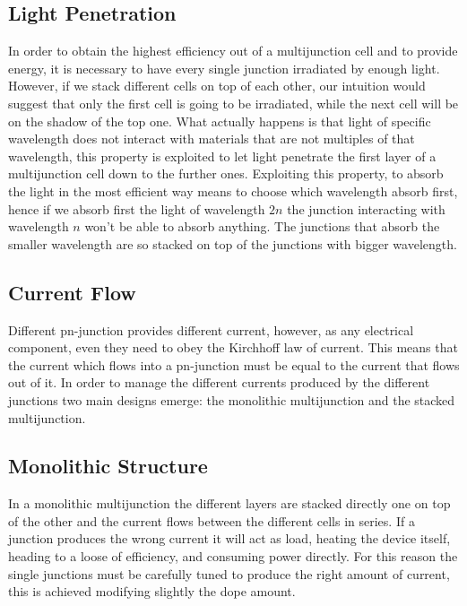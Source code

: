 \documentclass[11pt]{article} %
\begin{document}
\subsection{Light Penetration}

In order to obtain the highest efficiency out of a multijunction cell and to provide energy, it is necessary to have every single junction irradiated by enough light. 
However, if we stack different cells on top of each other, our intuition would suggest that only the first cell is going to be irradiated, while the next cell will be on the shadow of the top one.  
What actually happens is that light of specific wavelength does not interact with materials that are not multiples of that wavelength, this property is exploited to let light penetrate the first layer of a multijunction cell down to the further ones.  Exploiting this property, to absorb the light in the most efficient way means to choose which wavelength absorb first, hence if we absorb first the light of wavelength $2n$ the junction interacting with wavelength $n$ won't be able to absorb anything. The junctions that absorb the smaller wavelength are so stacked on top of the junctions with bigger wavelength.  

\subsection{Current Flow}

Different pn-junction provides different current, however, as any electrical component, even they need to obey the Kirchhoff law of current. This means that the current which flows into a pn-junction must be equal to the current that flows out of it.  In order to manage the different currents produced by the different junctions two main designs emerge: the monolithic multijunction and the stacked multijunction. 

\subsection{Monolithic Structure}

In a monolithic multijunction the different layers are stacked directly one on top of the other and the current flows between the different cells in series. If a junction produces the wrong current it will act as load, heating the device itself, heading to a loose of efficiency, and consuming power directly.  For this reason the single junctions must be carefully tuned to produce the right amount of current, this is achieved modifying slightly the dope amount.  
\end{document}
